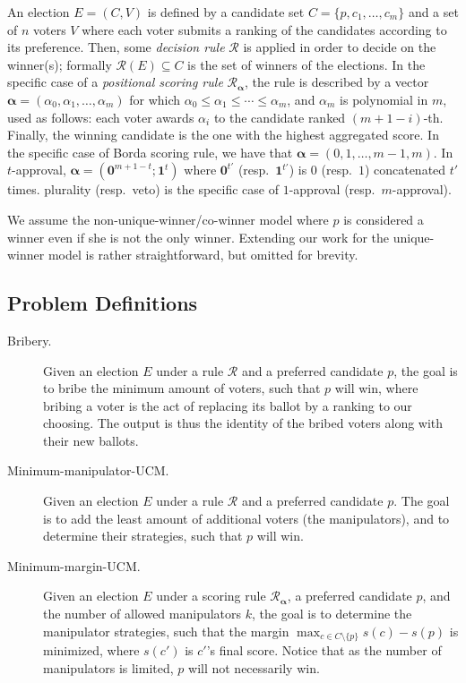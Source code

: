\documentclass[letterpaper]{article} %
\theoremstyle{definition}
\newcommand\vecc{\mathbf}
\newcommand\vecgreek{\bm}
\newcommand{\veca}{\vecgreek{\alpha}}
\newcommand{\Ra}{\mathcal{R}_{\veca}}
\begin{document}
An election $E=(C,V)$ is defined by a candidate set $C=\{p,c_1,\ldots,c_m\}$ and a set of $n$ voters $V$ where each voter submits a ranking of the candidates according to its preference. Then, some \emph{decision rule} $\mathcal{R}$ is applied in order to decide on the winner(s); formally $\mathcal{R}(E) \subseteq C$ is the set of winners of the elections. In the specific case of a \emph{positional scoring rule} $\Ra$, the rule is described by a vector  $\veca = (\alpha_0,\alpha_1,\ldots,\alpha_m)$ for which $\alpha_0\leq \alpha_1 \leq \cdots \leq\alpha_m$, and $\alpha_m$ is polynomial in $m$, used as follows: each voter awards $\alpha_i$ to the candidate ranked $(m+1-i)$-th. Finally, the winning candidate is the one with the highest aggregated score. In the specific case of Borda scoring rule, we have that $\veca=(0,1,\ldots,m-1,m)$. In $t$-approval, $\veca=(\vecc{0}^{m+1-t};\vecc{1}^t)$ where $\vecc{0}^{t'}$ (resp.\ $\vecc{1}^{t'}$) is $0$ (resp.\ $1$) concatenated $t'$ times. plurality (resp.\ veto) is the specific case of $1$-approval (resp.\ $m$-approval).

We assume the non-unique-winner/co-winner model where $p$ is considered a winner even if she is not the only winner. Extending our work for the unique-winner model is rather straightforward, but omitted for brevity.

\subsection{Problem Definitions}
\begin{description}
	\item[Bribery.] Given an election $E$ under a rule $\mathcal{R}$ and a preferred candidate $p$, the goal is to bribe the minimum amount of voters, such that $p$ will win, where bribing a voter is the act of replacing its ballot by a ranking to our choosing. The output is thus the identity of the bribed voters along with their new ballots.

	\item[Minimum-manipulator-UCM.] Given an election $E$ under a rule $\mathcal{R}$ and a preferred candidate $p$. The goal is to add the least amount of additional voters (the manipulators), and to determine their strategies, such that $p$ will win.

	\item[Minimum-margin-UCM.] Given an election $E$ under a scoring rule $\Ra$, a preferred candidate $p$, and the number of allowed manipulators $k$, the goal is to determine the manipulator strategies, such that the margin $\max_{c \in C \setminus \{p\}}s(c) - s(p)$ is minimized, where $s(c')$ is $c'$'s final score. Notice that as the number of manipulators is limited, $p$ will not necessarily win.
\end{description}
\end{document}
